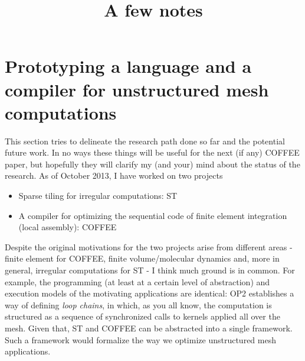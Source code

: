 \documentclass[a4paper]{article}
\title{A few notes}
\date{}
\begin{document}
\lstset{language=C, breaklines=true}
 
\maketitle

\section{Prototyping a language and a compiler for unstructured mesh computations}
This section tries to delineate the research path done so far and the potential future work. In no ways these things will be useful for the next (if any) COFFEE paper, but hopefully they will clarify my (and your) mind about the status of the research. As of October 2013, I have worked on two projects 
\begin{itemize}
\item Sparse tiling for irregular computations: ST
\item A compiler for optimizing the sequential code of finite element integration (local assembly): COFFEE
\end{itemize}
Despite the original motivations for the two projects arise from different areas - finite element for COFFEE, finite volume/molecular dynamics and, more in general, irregular computations for ST - I think much ground is in common. For example, the programming (at least at a certain level of abstraction) and execution models of the motivating applications are identical: OP2 establishes a way of defining \emph{loop chains}, in which, as you all know, the computation is structured as a sequence of synchronized calls to kernels applied all over the mesh. Given that, ST and COFFEE can be abstracted into a single framework. Such a framework would formalize the way we optimize unstructured mesh applications. 
\end{document}

